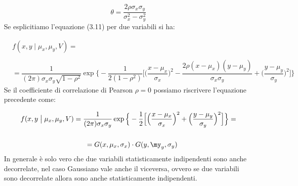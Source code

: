 \begin{equation}
	\theta = \dfrac{2\rho \sigma_x \sigma_y}{\sigma_x^2 - \sigma_y^2}
\end{equation}
\newline
Se esplicitiamo l'equazione (3.11) per due variabili si ha: 

\begin{align*}
	& f(x,y \; \big \vert \; \mu_x,\mu_y,V) = 
	\\
	\\
	&= \dfrac{1}{(2\pi)\sigma_x \sigma_y \sqrt{1-\rho^2}}  \exp{\Big \{ -\dfrac{1}{2(1-\rho^2)} \Big[ \Big ( \dfrac{x-\mu_x}{\sigma_x} \Big)^2 - \dfrac{2\rho(x-\mu_x)(y-\mu_y)}{\sigma_x \sigma_y} + \Big (\dfrac{y-\mu_y}{\sigma_y} \Big)^2  \Big]  \Big \}}	
\end{align*}
\newline
Se il coefficiente di correlazione di Pearson $\rho = 0$ possiamo riscrivere l'equazione precedente come:

\begin{align*}
	& f(x,y \; \big \vert \; \mu_x,\mu_y,V) = \dfrac{1}{(2\pi)\sigma_x \sigma_y} \exp{\Big \{ - \dfrac{1}{2} \Big[\Big ( \dfrac{x-\mu_x}{\sigma_x} \Big)^2 + \Big (\dfrac{y-\mu_y}{\sigma_y} \Big)^2 \Big] \Big \}} = 
	\\
	\\
	&\phantom{b= --------}= G(x,\mu_x,\sigma_x) \cdot G(y,\my_y,\sigma_y)
\end{align*}
\newline
In generale \`{e} solo vero che due variabili statisticamente indipendenti sono anche decorrelate, nel caso Gaussiano vale anche il viceversa, ovvero se due variabili sono decorrelate allora sono anche statisticamente indipendenti.

